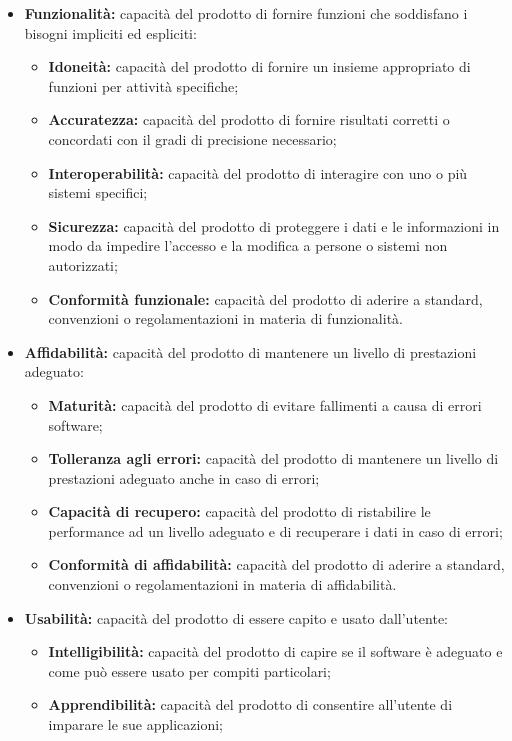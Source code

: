\begin{itemize}
	\item \textbf{Funzionalità:} capacità del prodotto di fornire funzioni che soddisfano i bisogni impliciti ed espliciti:
	\begin{itemize}
		\item \textbf{Idoneità:} capacità del prodotto di fornire un insieme appropriato di funzioni per attività specifiche;
		\item \textbf{Accuratezza:} capacità del prodotto di fornire risultati corretti o concordati con il gradi di precisione necessario;
		\item \textbf{Interoperabilità:} capacità del prodotto di interagire con uno o più sistemi specifici;
		\item \textbf{Sicurezza:} capacità del prodotto di proteggere i dati e le informazioni in modo da impedire l'accesso e la modifica a persone o sistemi non autorizzati;
		\item \textbf{Conformità funzionale:} capacità del prodotto di aderire a standard, convenzioni o regolamentazioni in materia di funzionalità.
	\end{itemize}
	\item \textbf{Affidabilità:} capacità del prodotto di mantenere un livello di prestazioni adeguato:
	\begin{itemize}
		\item \textbf{Maturità:} capacità del prodotto di evitare fallimenti a causa di errori software;
		\item \textbf{Tolleranza agli errori:} capacità del prodotto di mantenere un livello di prestazioni adeguato anche in caso di errori;
		\item \textbf{Capacità di recupero:} capacità del prodotto di ristabilire le performance ad un livello adeguato e di recuperare i dati in caso di errori;
		\item \textbf{Conformità di affidabilità:} capacità del prodotto di aderire a standard, convenzioni o regolamentazioni in materia di affidabilità.
	\end{itemize}
	\item \textbf{Usabilità:} capacità del prodotto di essere capito e usato dall'utente:
	\begin{itemize}
		\item \textbf{Intelligibilità:} capacità del prodotto di capire se il software è adeguato e come può essere usato per compiti particolari;
		\item \textbf{Apprendibilità:} capacità del prodotto di consentire all'utente di imparare le sue applicazioni;

\end{itemize}
\end{itemize}
